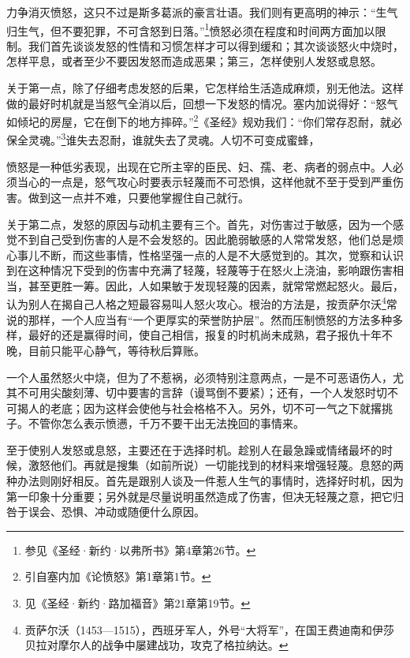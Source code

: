 \par 力争消灭愤怒，这只不过是斯多葛派的豪言壮语。我们则有更高明的神示：“生气归生气，但不要犯罪，不可含怒到日落。”\footnote{参见《圣经·新约·以弗所书》第4章第26节。}愤怒必须在程度和时间两方面加以限制。我们首先谈谈发怒的性情和习惯怎样才可以得到缓和；其次谈谈怒火中烧时，怎样平息，或者至少不要因发怒而造成恶果；第三，怎样使别人发怒或息怒。
\par 关于第一点，除了仔细考虑发怒的后果，它怎样给生活造成麻烦，别无他法。这样做的最好时机就是当怒气全消以后，回想一下发怒的情况。塞内加说得好：“怒气如倾圮的房屋，它在倒下的地方摔碎。”\footnote{引自塞内加《论愤怒》第1章第1节。}《圣经》规劝我们：“你们常存忍耐，就必保全灵魂。”\footnote{见《圣经·新约·路加福音》第21章第19节。}谁失去忍耐，谁就失去了灵魂。人切不可变成蜜蜂，
\par 愤怒是一种低劣表现，出现在它所主宰的臣民、妇、孺、老、病者的弱点中。人必须当心的一点是，怒气攻心时要表示轻蔑而不可恐惧，这样他就不至于受到严重伤害。做到这一点并不难，只要他掌握住自己就行。
\par 关于第二点，发怒的原因与动机主要有三个。首先，对伤害过于敏感，因为一个感觉不到自己受到伤害的人是不会发怒的。因此脆弱敏感的人常常发怒，他们总是烦心事儿不断，而这些事情，性格坚强一点的人是不大感觉到的。其次，觉察和认识到在这种情况下受到的伤害中充满了轻蔑，轻蔑等于在怒火上浇油，影响跟伤害相当，甚至更胜一筹。因此，人如果敏于发现轻蔑的因素，就常常燃起怒火。最后，认为别人在揭自己人格之短最容易叫人怒火攻心。根治的方法是，按贡萨尔沃\footnote{贡萨尔沃（1453—1515），西班牙军人，外号“大将军”，在国王费迪南和伊莎贝拉对摩尔人的战争中屡建战功，攻克了格拉纳达。}常说的那样，一个人应当有“一个更厚实的荣誉防护层”。然而压制愤怒的方法多种多样，最好的还是赢得时间，使自己相信，报复的时机尚未成熟，君子报仇十年不晚，目前只能平心静气，等待秋后算账。
\par 一个人虽然怒火中烧，但为了不惹祸，必须特别注意两点，一是不可恶语伤人，尤其不可用尖酸刻薄、切中要害的言辞（谩骂倒不要紧）；还有，一个人发怒时切不可揭人的老底；因为这样会使他与社会格格不入。另外，切不可一气之下就撂挑子。不管你怎么表示愤懑，千万不要干出无法挽回的事情来。
\par 至于使别人发怒或息怒，主要还在于选择时机。趁别人在最急躁或情绪最坏的时候，激怒他们。再就是搜集（如前所说）一切能找到的材料来增强轻蔑。息怒的两种办法则刚好相反。首先是跟别人谈及一件惹人生气的事情时，选择好时机，因为第一印象十分重要；另外就是尽量说明虽然造成了伤害，但决无轻蔑之意，把它归咎于误会、恐惧、冲动或随便什么原因。



